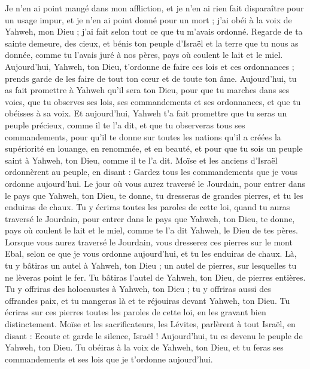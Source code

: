 \begin{multicols}{2}
Je n'en ai point mangé dans mon affliction, et je n'en ai rien fait disparaître pour un usage impur, et je n'en ai point donné pour un mort ; j'ai obéi à la voix de Yahweh, mon Dieu ; j'ai fait selon tout ce que tu m'avais ordonné.
Regarde de ta sainte demeure, des cieux, et bénis ton peuple d'Israël et la terre que tu nous as donnée, comme tu l'avais juré à nos pères, pays où coulent le lait et le miel.
Aujourd'hui, Yahweh, ton Dieu, t'ordonne de faire ces lois et ces ordonnances ; prends garde de les faire de tout ton cœur et de toute ton âme.
Aujourd'hui, tu as fait promettre à Yahweh qu'il sera ton Dieu, pour que tu marches dans ses voies, que tu observes ses lois, ses commandements et ses ordonnances, et que tu obéisses à sa voix.
Et aujourd'hui, Yahweh t'a fait promettre que tu seras un peuple précieux, comme il te l'a dit, et que tu observeras tous ses commandements,
pour qu'il te donne sur toutes les nations qu'il a créées la supériorité en louange, en renommée, et en beauté, et pour que tu sois un peuple saint à Yahweh, ton Dieu, comme il te l'a dit.
\VerseOne{}Moïse et les anciens d'Israël ordonnèrent au peuple, en disant : Gardez tous les commandements que je vous ordonne aujourd'hui.
Le jour où vous aurez traversé le Jourdain, pour entrer dans le pays que Yahweh, ton Dieu, te donne, tu dresseras de grandes pierres, et tu les enduiras de chaux.
Tu y écriras toutes les paroles de cette loi, quand tu auras traversé le Jourdain, pour entrer dans le pays que Yahweh, ton Dieu, te donne, pays où coulent le lait et le miel, comme te l'a dit Yahweh, le Dieu de tes pères.
Lorsque vous aurez traversé le Jourdain, vous dresserez ces pierres sur le mont Ebal, selon ce que je vous ordonne aujourd'hui, et tu les enduiras de chaux.
Là, tu y bâtiras un autel à Yahweh, ton Dieu ; un autel de pierres, sur lesquelles tu ne lèveras point le fer.
Tu bâtiras l'autel de Yahweh, ton Dieu, de pierres entières. Tu y offriras des holocaustes à Yahweh, ton Dieu ;
tu y offriras aussi des offrandes paix, et tu mangeras là et te réjouiras devant Yahweh, ton Dieu.
Tu écriras sur ces pierres toutes les paroles de cette loi, en les gravant bien distinctement.
Moïse et les sacrificateurs, les Lévites, parlèrent à tout Israël, en disant : Ecoute et garde le silence, Israël ! Aujourd'hui, tu es devenu le peuple de Yahweh, ton Dieu.
Tu obéiras à la voix de Yahweh, ton Dieu, et tu feras ses commandements et ses lois que je t'ordonne aujourd'hui.

\end{multicols}
